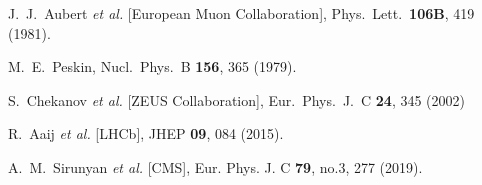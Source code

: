 \documentclass[10pt,prd,aps,nofootinbib,superscriptaddress]{revtex4}
\begin{document}
\begin{thebibliography}{99}
  J.~J.~Aubert {\it et al.} [European Muon Collaboration],
  Phys.\ Lett.\  {\bf 106B}, 419 (1981).
 
  M.~E.~Peskin,
  Nucl.\ Phys.\ B {\bf 156}, 365 (1979).

 

  S.~Chekanov {\it et al.} [ZEUS Collaboration],
  Eur.\ Phys.\ J.\ C {\bf 24}, 345 (2002)


R.~Aaij \textit{et al.} [LHCb],
JHEP \textbf{09}, 084 (2015). 


A.~M.~Sirunyan \textit{et al.} [CMS],
Eur. Phys. J. C \textbf{79}, no.3, 277 (2019). 

\end{thebibliography}
\end{document}
